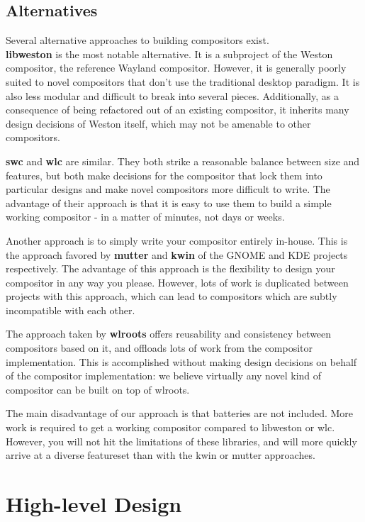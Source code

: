 \documentclass{article}
\begin{document}
\subsection{Alternatives}\label{alternatives}

Several alternative approaches to building compositors exist.\\

\textbf{libweston} is the most notable alternative. It is a subproject of the
Weston compositor, the reference Wayland compositor. However, it is generally
poorly suited to novel compositors that don't use the traditional desktop
paradigm. It is also less modular and difficult to break into several pieces.
Additionally, as a consequence of being refactored out of an existing
compositor, it inherits many design decisions of Weston itself, which may not be
amenable to other compositors.

\textbf{swc} and \textbf{wlc} are similar. They both strike a reasonable balance
between size and features, but both make decisions for the compositor that lock
them into particular designs and make novel compositors more difficult to
write. The advantage of their approach is that it is easy to use them to build a
simple working compositor - in a matter of minutes, not days or weeks.

Another approach is to simply write your compositor entirely in-house. This is
the approach favored by \textbf{mutter} and \textbf{kwin} of the GNOME and KDE
projects respectively. The advantage of this approach is the flexibility to
design your compositor in any way you please. However, lots of work is
duplicated between projects with this approach, which can lead to compositors
which are subtly incompatible with each other.

The approach taken by \textbf{wlroots} offers reusability and consistency
between compositors based on it, and offloads lots of work from the compositor
implementation. This is accomplished without making design decisions on behalf
of the compositor implementation: we believe virtually any novel kind of
compositor can be built on top of wlroots.

The main disadvantage of our approach is that batteries are not included. More
work is required to get a working compositor compared to libweston or wlc.
However, you will not hit the limitations of these libraries, and will more
quickly arrive at a diverse featureset than with the kwin or mutter approaches.

\section{High-level Design}\label{highlevel}
\end{document}
